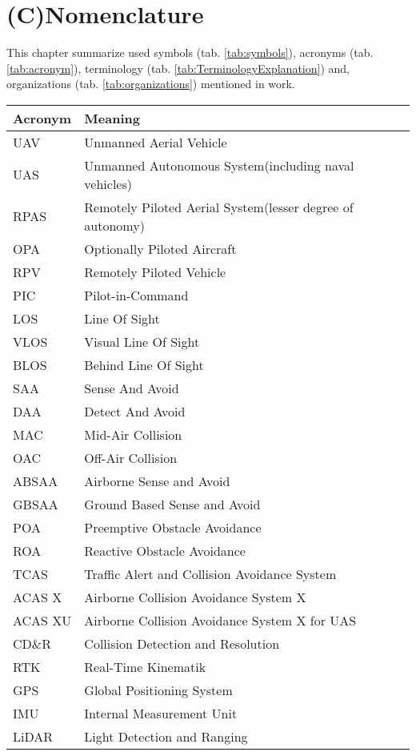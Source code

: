 \section*{(C)Nomenclature}
\noindent
This chapter summarize used symbols (tab. \ref{tab:symbols}), acronyms (tab. \ref{tab:acronym}), terminology (tab. \ref{tab:TerminologyExplanation}) and, organizations (tab. \ref{tab:organizations}) mentioned in work. 

\begin{tabularx}{\textwidth}{l|X} 
    Acronym & Meaning\\ \hline\hline
    UAV & Unmanned Aerial Vehicle\\ 
    UAS & Unmanned Autonomous System(including naval vehicles)\\ 
    RPAS & Remotely Piloted Aerial System(lesser degree of autonomy)\\ 
    OPA & Optionally Piloted Aircraft\\
    RPV & Remotely Piloted Vehicle\\
    PIC & Pilot-in-Command\\\hline
    LOS & Line Of Sight\\ 
    VLOS & Visual Line Of Sight\\ 
    BLOS & Behind Line Of Sight\\ \hline
    SAA & Sense And Avoid\\ 
    DAA & Detect And Avoid \\ 
    MAC & Mid-Air Collision \\
    OAC & Off-Air Collision \\
    ABSAA & Airborne Sense and Avoid\\
    GBSAA & Ground Based Sense and Avoid\\
    POA & Preemptive Obstacle Avoidance\\
    ROA & Reactive Obstacle Avoidance \\\hline
    TCAS &Traffic Alert and Collision Avoidance System\\
    ACAS X & Airborne Collision Avoidance System X\\
    ACAS XU & Airborne Collision Avoidance System X for UAS\\
    CD\&R & Collision Detection and Resolution\\ \hline
    RTK & Real-Time Kinematik\\ 
    GPS & Global Positioning System\\ 
    IMU & Internal Measurement Unit\\ 
    LiDAR &  Light Detection and Ranging \\ 

\end{tabularx}
